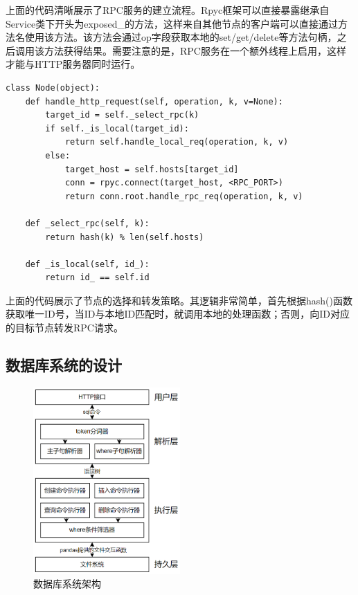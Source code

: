 上面的代码清晰展示了RPC服务的建立流程。Rpyc框架可以直接暴露继承自Service类下开头为exposed\_的方法，这样来自其他节点的客户端可以直接通过方法名使用该方法。该方法会通过op字段获取本地的set/get/delete等方法句柄，之后调用该方法获得结果。需要注意的是，RPC服务在一个额外线程上启用，这样才能与HTTP服务器同时运行。

\begin{lstlisting}
class Node(object):
    def handle_http_request(self, operation, k, v=None):
        target_id = self._select_rpc(k)
        if self._is_local(target_id):
            return self.handle_local_req(operation, k, v)
        else:
            target_host = self.hosts[target_id]
            conn = rpyc.connect(target_host, <RPC_PORT>)
            return conn.root.handle_rpc_req(operation, k, v)
        
    def _select_rpc(self, k):
        return hash(k) % len(self.hosts)

    def _is_local(self, id_):
        return id_ == self.id
\end{lstlisting}

上面的代码展示了节点的选择和转发策略。其逻辑非常简单，首先根据hash()函数获取唯一ID号，当ID与本地ID匹配时，就调用本地的处理函数；否则，向ID对应的目标节点转发RPC请求。

\subsection{数据库系统的设计}

\begin{figure}[H]
    \includegraphics[width=0.5\textwidth]{examples/数据库系统架构.png}
    \centering
    \caption{数据库系统架构}
    \label{fig:db-arch}
\end{figure}

